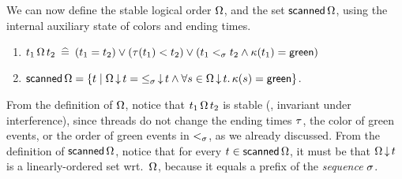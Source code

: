 \begin{comment}
Proposition~\ref{inv:readFP} states that any non-$\bot$ value read
from the forwarding pointer $\mathit{fp}$ at line 12 might have been
written to $p$ after the scanner cleared the forwarding pointers, and
and hence, be newer than the values read in line 10. This captures the
essence of the first part of Jayanti's Second forwarding principle.
%
Proposition~\ref{inv:redzone} states that when the scanner is in
between lines~\lineScanReadsFX--\lineScanRelinks\ in
Figure~\ref{fig:jayanti-snapshot}, then $\hist$ can be partitioned
into a non-empty prefix with yellow and/or green timestamps, and a
reds-only suffix. Moreover, if a new write event $t$ occurs at this
point, with $ \toff < t <= \E (t)$, it will be colored red and hence
ignored by the current scanner. This later fact captures the last part
of the second Forwarding Principle. Later on, this proposition will be
crucial into proving that relink does not affect the order of write
events that are meant to missed, by keeping them in the red suffix,
and also that those being reordered are overlapping.

\gad{Explain better? The second part of this invariant might also be
  connected to Jayanti's ``Correctness'' Theorem, Lemma 5 in his
  Appendix. I'm not sure however if I need to express its connection
  here.}
\end{comment}

We can now define the stable logical order $\Omega$, and the set
$\mathsf{scanned}\,\Omega$, using the internal auxiliary state of colors
and ending times.
%
\begin{definition}\label{def-jleq}
  
\begin{enumerate}
\item $t_1\,{\Omega}\,t_2 \mathrel{\:\widehat{=}\:} (t_1 = t_2) \vee (\tau(t_1) <
  t_2) \vee (t_1 \mathrel{<_\sigma} t_2 \wedge \kappa(t_1) = \mathsf{green})$
\item  $\mathsf{scanned}\,\Omega = \{t \mid \Omega\,{\downarrow}\,t = {\mathrel{\leq_\sigma}}\,{\downarrow}\,t \wedge \forall s\in \Omega\,{\downarrow}\,t\mathord{.}\, \kappa(s) = \mathsf{green}\}$.
\end{enumerate}
\end{definition}

From the definition of $\Omega$, notice that
$t_1\,{\Omega}\,t_2$ is stable (\ie, invariant under
interference), since threads do not change the ending times $\tau$, the
color of green events, or the order of green events in $\mathrel{<_\sigma}$, as we
already discussed. 
%
From the definition of $\mathsf{scanned}\,\Omega$, notice that for every
$t \in \mathsf{scanned}\,\Omega$, it must be that
$\Omega\,{\downarrow}\,t$ is a linearly-ordered set
wrt.~$\Omega$, because it equals a prefix of the \emph{sequence}
$\sigma$.

